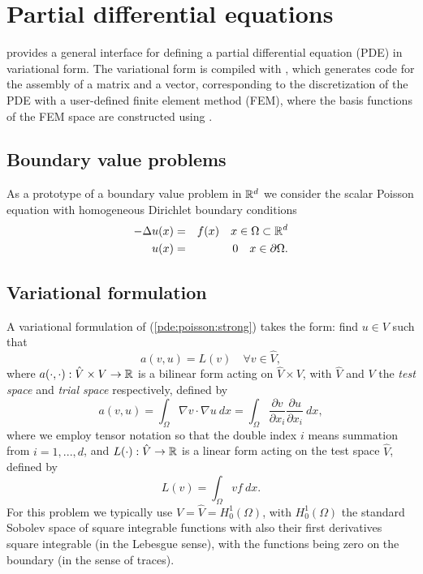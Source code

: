\chapter{Partial differential equations}
\label{sec:pde}

\dolfin{} provides a general interface for defining a partial differential 
equation (PDE) in variational form. The variational form is compiled 
with \ffc{}, which generates code for the assembly of a matrix and a 
vector, corresponding to the discretization of the PDE with a user-defined  
finite element method (FEM), where the basis functions of the FEM space 
are constructed using \fiat{}. 

\section{Boundary value problems}

As a prototype of a boundary value problem in $\Bbb{R}^d$ we consider the 
scalar Poisson equation with homogeneous Dirichlet boundary conditions 
\begin{eqnarray}
-\Delta u(x)&=&f(x) \quad x\in \Omega \subset \Bbb{R}^d \label{pde:poisson:strong} \\
u(x)&=&0 \quad x\in \partial \Omega. \nonumber  
\end{eqnarray}

\section{Variational formulation}

A variational formulation of (\ref{pde:poisson:strong}) takes the form: 
find $u\in V$ such that  
\begin{equation}\label{pde:poisson:weak}
a(v,u)=L(v) \quad \forall v\in \hat V, 
\end{equation}
where $a(\cdot,\cdot):\hat V\times V\rightarrow \Bbb{R}$ is a bilinear form 
acting on $\hat V \times V$, with $\hat V$ and $V$ the {\em test space} and {\em trial space} 
respectively, defined by 
\begin{equation}
a(v,u)=\int_{\Omega} \nabla v \cdot \nabla u ~dx 
=\int_{\Omega} \frac{\partial v}{\partial x_i} \frac{\partial u}{\partial x_i} ~ dx,  
\end{equation}
where we employ tensor notation so that the double index $i$ means summation from $i=1,...,d$, 
and $L(\cdot):\hat V\rightarrow \Bbb{R}$ is a linear form acting on the test space $\hat V$,  
defined by 
\begin{equation}
L(v)=\int_{\Omega} v f ~dx.  
\end{equation}
For this problem we typically use $V=\hat V=H^1_0(\Omega)$, with $H^1_0(\Omega)$ 
the standard Sobolev space of square integrable functions with also their first 
derivatives square integrable (in the Lebesgue sense), 
with the functions being zero on the boundary (in the sense of traces).   

